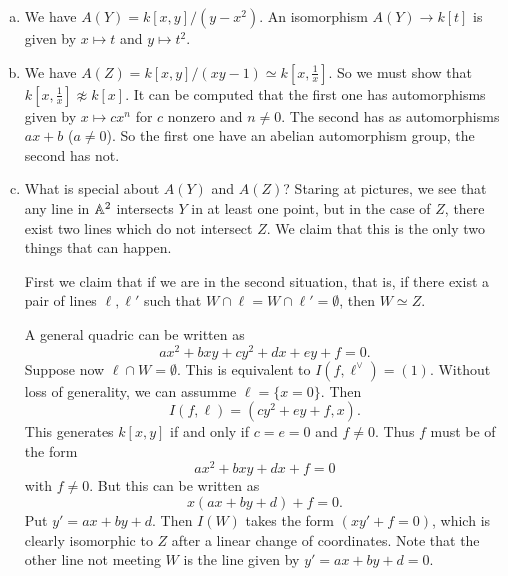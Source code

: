 \documentclass[11pt, english]{article}
\begin{document}
\begin{sol}
  \begin{enumerate}[a)]
  \item  We have $A(Y)=k[x,y]/(y-x^2)$. An isomorphism $A(Y) \to k[t]$ is given by $x \mapsto t$ and $y \mapsto t^2$. 
\item We have $A(Z) = k[x,y]/(xy-1) \simeq k[x,\frac 1x]$. So we must show that $k[x,\frac 1x] \not \approx k[x]$. It can be computed that the first one has automorphisms given by $x \mapsto cx^n$ for $c$ nonzero and $n \neq 0$. The second has as automorphisms $ax+b$ ($a \neq 0$). So the first one have an abelian automorphism group, the second has not.
\item What is special about $A(Y)$ and $A(Z)$? Staring at pictures, we see that any line in $\mathbb{A}^2$ intersects $Y$ in at least one point, but in the case of $Z$, there exist two lines which do not intersect $Z$. We claim that this is the only two things that can happen.

First we claim that if we are in the second situation, that is, if there exist a pair of lines $\ell,\ell'$ such that $W \cap \ell = W \cap \ell' =\emptyset$, then $W \simeq Z$. 

A general quadric can be written as
\[
ax^2+bxy+cy^2+dx+ey+f=0.
\]
Suppose now $\ell \cap W=\emptyset$. This is equivalent to $I(f,\ell^\vee)=(1)$. Without loss of generality, we can assumme $\ell = \{ x = 0 \}$. Then
\[
I(f,\ell) = (cy^2+ey+f,x).
\]
This generates $k[x,y]$ if and only if $c=e=0$ and $f \neq 0$. Thus $f$ must be of the form
\[
ax^2+bxy+dx+f=0
\]
with $f \neq 0$. But this can be written as
\[
x(ax+by+d)+f = 0.
\]
Put $y' = ax+by+d$. Then $I(W)$ takes the form $(xy'+f=0)$, which is clearly isomorphic to $Z$ after a linear change of coordinates. Note that the other line not meeting $W$ is the line given by $y'=ax+by+d=0$.


\end{enumerate}
\end{sol}
\end{document}
